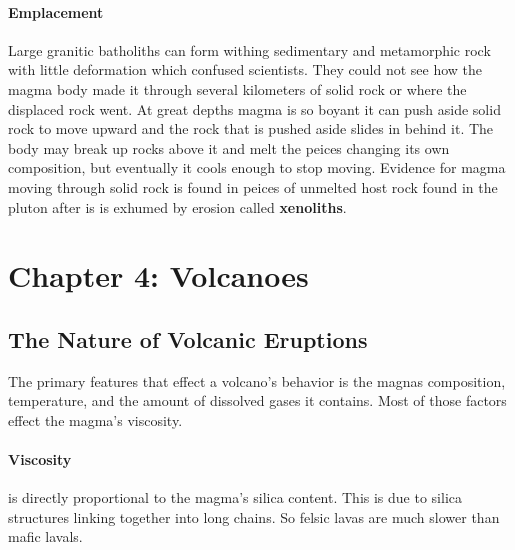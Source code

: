 \documentclass{article}
\begin{document}
\paragraph{Emplacement} %
\label{par:emplacement}
Large granitic batholiths can form withing sedimentary and metamorphic rock with little deformation which confused scientists. They could not see how the magma body made it through several kilometers of solid rock or where the displaced rock went. At great depths magma is so boyant it can push aside solid rock to move upward and the rock that is pushed aside slides in behind it. The body may break up rocks above it and melt the peices changing its own composition, but eventually it cools enough to stop moving. Evidence for magma moving through solid rock is found in peices of unmelted host rock found in the pluton after is is exhumed by erosion called \textbf{xenoliths}.


\section*{Chapter 4: Volcanoes} %
\label{sec:chapter_4_volcanoes}
\subsection*{The Nature of Volcanic Eruptions} %
\label{sub:the_nature_of_volcanic_eruptions}
The primary features that effect a volcano's behavior is the magnas composition, temperature, and the amount of dissolved gases it contains. Most of those factors effect the magma's viscosity.

\paragraph{Viscosity} %
\label{par:viscosity}
is directly proportional to the magma's silica content. This is due to silica structures linking together into long chains. So felsic lavas are much slower than mafic lavals.
\end{document}
